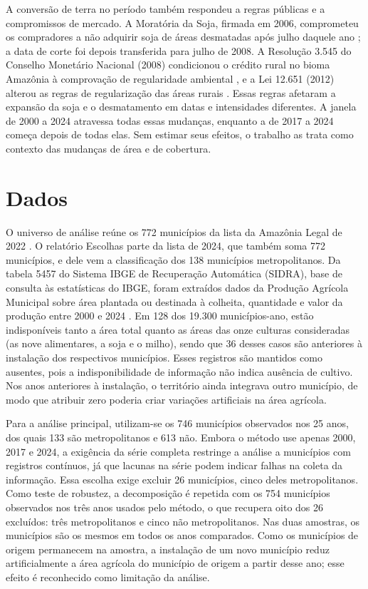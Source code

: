 \documentclass[11pt,a4paper]{article}
\begin{document}
A conversão de terra no período também respondeu a regras públicas e a compromissos de mercado. A Moratória da Soja, firmada em 2006, comprometeu os compradores a não adquirir soja de áreas desmatadas após julho daquele ano \citep{nepstad2014}; a data de corte foi depois transferida para julho de 2008. A Resolução 3.545 do Conselho Monetário Nacional (2008) condicionou o crédito rural no bioma Amazônia à comprovação de regularidade ambiental \citep{bcb2008}, e a Lei 12.651 (2012) alterou as regras de regularização das áreas rurais \citep{brancalion2016}. Essas regras afetaram a expansão da soja e o desmatamento em datas e intensidades diferentes. A janela de 2000 a 2024 atravessa todas essas mudanças, enquanto a de 2017 a 2024 começa depois de todas elas. Sem estimar seus efeitos, o trabalho as trata como contexto das mudanças de área e de cobertura.

\section{Dados}\label{sec:dados}

O universo de análise reúne os 772 municípios da lista da Amazônia Legal de 2022 \citep{ibge2022}. O relatório Escolhas parte da lista de 2024, que também soma 772 municípios, e dele vem a classificação dos 138 municípios metropolitanos. Da tabela 5457 do Sistema IBGE de Recuperação Automática (SIDRA), base de consulta às estatísticas do IBGE, foram extraídos dados da Produção Agrícola Municipal sobre área plantada ou destinada à colheita, quantidade e valor da produção entre 2000 e 2024 \citep{pam2026}. Em 128 dos 19.300 municípios-ano, estão indisponíveis tanto a área total quanto as áreas das onze culturas consideradas (as nove alimentares, a soja e o milho), sendo que 36 desses casos são anteriores à instalação dos respectivos municípios. Esses registros são mantidos como ausentes, pois a indisponibilidade de informação não indica ausência de cultivo. Nos anos anteriores à instalação, o território ainda integrava outro município, de modo que atribuir zero poderia criar variações artificiais na área agrícola.

Para a análise principal, utilizam-se os 746 municípios observados nos 25 anos, dos quais 133 são metropolitanos e 613 não. Embora o método use apenas 2000, 2017 e 2024, a exigência da série completa restringe a análise a municípios com registros contínuos, já que lacunas na série podem indicar falhas na coleta da informação. Essa escolha exige excluir 26 municípios, cinco deles metropolitanos. Como teste de robustez, a decomposição é repetida com os 754 municípios observados nos três anos usados pelo método, o que recupera oito dos 26 excluídos: três metropolitanos e cinco não metropolitanos. Nas duas amostras, os municípios são os mesmos em todos os anos comparados. Como os municípios de origem permanecem na amostra, a instalação de um novo município reduz artificialmente a área agrícola do município de origem a partir desse ano; esse efeito é reconhecido como limitação da análise.
\end{document}
